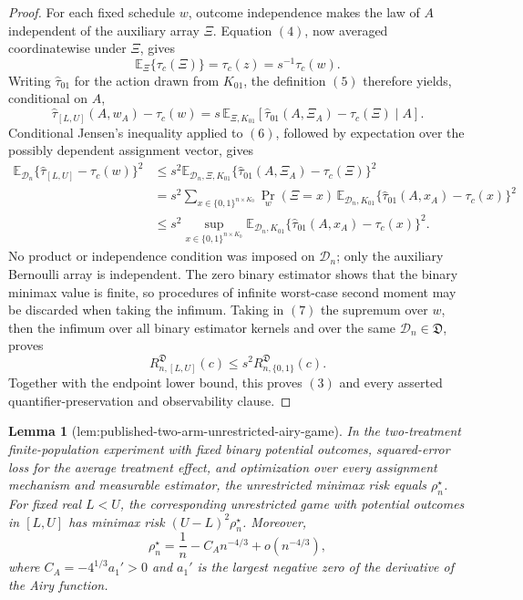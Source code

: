 \documentclass{article}
\newtheorem{lemma}{Lemma}
\begin{document}
{\begin{proof}
For each fixed schedule \(w\), outcome independence makes the law of \(A\) independent of the auxiliary array \(\Xi\).  Equation \((4)\), now averaged coordinatewise under \(\Xi\), gives
\[
 \mathbb E_{\Xi}\{\tau_c(\Xi)\}
 =\tau_c(z)=s^{-1}\tau_c(w).
\]
Writing \(\widehat\tau_{01}\) for the action drawn from \(K_{01}\), the definition \((5)\) therefore yields, conditional on \(A\),
\[
 \widehat\tau_{[L,U]}(A,w_A)-\tau_c(w)
 =s\,\mathbb E_{\Xi,K_{01}}\!\left[
 \widehat\tau_{01}(A,\Xi_A)-\tau_c(\Xi)\mid A\right].
\tag{6}
\]
Conditional Jensen's inequality applied to \((6)\), followed by expectation over the possibly dependent assignment vector, gives
\[
\begin{aligned}
 \mathbb E_{\mathcal D_n}
 \{\widehat\tau_{[L,U]}-\tau_c(w)\}^2
 &\le s^2\mathbb E_{\mathcal D_n,\Xi,K_{01}}
 \{\widehat\tau_{01}(A,\Xi_A)-\tau_c(\Xi)\}^2\\
 &=s^2\sum_{x\in\{0,1\}^{n\times K_0}}
 \Pr_w(\Xi=x)\,
 \mathbb E_{\mathcal D_n,K_{01}}
 \{\widehat\tau_{01}(A,x_A)-\tau_c(x)\}^2\\
 &\le s^2\sup_{x\in\{0,1\}^{n\times K_0}}
 \mathbb E_{\mathcal D_n,K_{01}}
 \{\widehat\tau_{01}(A,x_A)-\tau_c(x)\}^2.
\end{aligned}
\tag{7}
\]
No product or independence condition was imposed on \(\mathcal D_n\); only the auxiliary Bernoulli array is independent.  The zero binary estimator shows that the binary minimax value is finite, so procedures of infinite worst-case second moment may be discarded when taking the infimum.  Taking in \((7)\) the supremum over \(w\), then the infimum over all binary estimator kernels and over the same \(\mathcal D_n\in\mathfrak D\), proves
\[
 R^{\mathfrak D}_{n,[L,U]}(c)
 \le s^2R^{\mathfrak D}_{n,\{0,1\}}(c).
\]
Together with the endpoint lower bound, this proves \((3)\) and every asserted quantifier-preservation and observability clause.
\end{proof}

\begin{lemma}[lem:published-two-arm-unrestricted-airy-game]\label{lem:published-two-arm-unrestricted-airy-game}
In the two-treatment finite-population experiment with fixed binary potential outcomes, squared-error loss for the average treatment effect, and optimization over every assignment mechanism and measurable estimator, the unrestricted minimax risk equals \(\rho_n^\star\).  For fixed real \(L<U\), the corresponding unrestricted game with potential outcomes in \([L,U]\) has minimax risk \((U-L)^2\rho_n^\star\).  Moreover,
\[
 \rho_n^\star=\frac1n-C_An^{-4/3}+o(n^{-4/3}),
\]
where \(C_A=-4^{1/3}a_1'>0\) and \(a_1'\) is the largest negative zero of the derivative of the Airy function.
\end{lemma}

}
\end{document}
